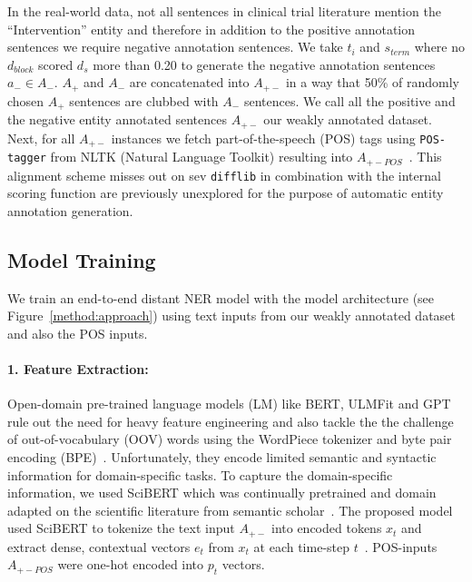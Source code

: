 \documentclass[letterpaper]{article} %
\begin{document}
In the real-world data, not all sentences in clinical trial literature mention the ``Intervention'' entity and therefore in addition to the positive annotation sentences we require negative annotation sentences.
We take $t_i$ and $s_{term}$ where no $d_{block}$ scored $d_s$ more than 0.20 to generate the negative annotation sentences $a_{-} \in A_{-}$.
$A_{+}$ and $A_{-}$ are concatenated into $A_{+-}$ in a way that 50\% of randomly chosen $A_{+}$ sentences are clubbed with $A_{-}$ sentences.
We call all the positive and the negative entity annotated sentences $A_{+-}$ our weakly annotated dataset.
Next, for all $A_{+-}$ instances we fetch part-of-the-speech (POS) tags using {\tt POS-tagger} from NLTK (Natural Language Toolkit) resulting into $A_{+-POS}$~\cite{augenstein2017generalisation}.
This alignment scheme misses out on sev
{\tt difflib} in combination with the internal scoring function are previously unexplored for the purpose of automatic entity annotation generation. 
%
\subsection{Model Training}
\label{subsec:training}
%
We train an end-to-end distant NER model with the model architecture (see Figure~\ref{method:approach}) using text inputs from our weakly annotated dataset and also the POS inputs.
%
\paragraph{1. Feature Extraction:}
%
Open-domain pre-trained language models (LM) like BERT, ULMFit and GPT rule out the need for heavy feature engineering and also tackle the the challenge of out-of-vocabulary (OOV) words using the WordPiece tokenizer and byte pair encoding (BPE)~\cite{devlin2018bert,joshi2019comparison}.
Unfortunately, they encode limited semantic and syntactic information for domain-specific tasks.
To capture the domain-specific information, we used SciBERT which was continually pretrained and domain adapted on the scientific literature from semantic scholar~\cite{gururangan2020don}.
The proposed model used SciBERT to tokenize the text input $A_{+-}$ into encoded tokens $x_{t}$ and extract dense, contextual vectors $e_{t}$ from $x_{t}$ at each time-step $t$~\cite{beltagy2019scibert}.
POS-inputs $A_{+-POS}$ were one-hot encoded into $p_{t}$ vectors.
%
\end{document}
